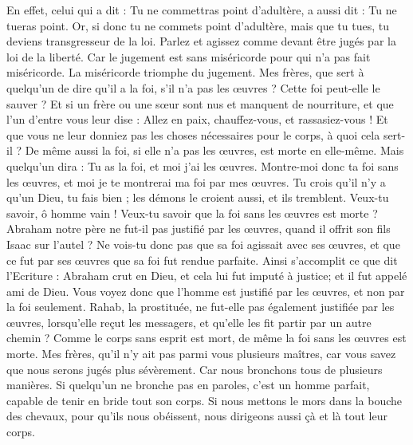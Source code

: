 \begin{multicols}{2}
En effet, celui qui a dit : Tu ne commettras point d’adultère, a aussi dit : Tu ne tueras point. Or, si donc tu ne commets point d’adultère{}, mais que tu tues, tu deviens transgresseur de la loi.
Parlez et agissez comme devant être jugés par la loi de la liberté.
Car le jugement est sans miséricorde pour qui n’a pas fait miséricorde{}. La miséricorde triomphe du jugement.
Mes frères, que sert à quelqu'un de dire qu'il a la foi, s’il n’a pas les œuvres ? Cette foi peut-elle le sauver ?
Et si un frère ou une sœur sont nus et manquent de nourriture,
et que l’un d'entre vous leur dise : Allez en paix, chauffez-vous, et rassasiez-vous ! Et que vous ne leur donniez pas les choses nécessaires pour le corps, à quoi cela sert-il ?
De même aussi la foi, si elle n'a pas les œuvres, est morte en elle-même.
Mais quelqu'un dira : Tu as la foi, et moi j'ai les œuvres. Montre-moi donc ta foi sans les œuvres, et moi je te montrerai ma foi par mes œuvres.
Tu crois qu'il n'y a qu'un Dieu, tu fais bien ; les démons le croient aussi, et ils tremblent.
Veux-tu savoir, ô homme vain ! Veux-tu savoir que la foi sans les œuvres est morte ?
Abraham notre père ne fut-il pas justifié par les œuvres, quand il offrit son fils Isaac sur l'autel ?
Ne vois-tu donc pas que sa foi agissait avec ses œuvres, et que ce fut par ses œuvres que sa foi fut rendue parfaite.
Ainsi s’accomplit ce que dit l’Ecriture : Abraham crut en Dieu, et cela lui fut imputé à justice{}; et il fut appelé ami de Dieu.
Vous voyez donc que l'homme est justifié par les œuvres, et non par la foi seulement.
Rahab, la prostituée, ne fut-elle pas également justifiée par les œuvres, lorsqu’elle reçut les messagers, et qu'elle les fit partir par un autre chemin{} ?
Comme le corps sans esprit est mort, de même la foi sans les œuvres est morte.
\VerseOne{}Mes frères, qu’il n’y ait pas parmi vous plusieurs maîtres{}, car vous savez que nous serons jugés plus sévèrement.
Car nous bronchons tous de plusieurs manières. Si quelqu'un ne bronche pas en paroles, c’est un homme parfait, capable de tenir en bride tout son corps.
Si nous mettons le mors dans la bouche des chevaux, pour qu'ils nous obéissent, nous dirigeons aussi çà et là tout leur corps.

\end{multicols}

